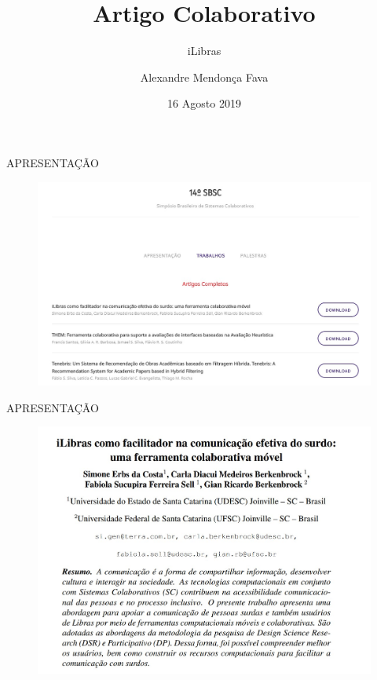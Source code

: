 \documentclass{Alexandre}
\title{Artigo Colaborativo}
\subtitle{iLibras}
\author{Alexandre Mendonça Fava\inst{1}}
\institute[UDESC]{
  \newline \newline \newline
  \inst{1}
  Mestrado Acadêmico em Computação Aplicada - PPGCA
}
\date{16 Agosto 2019}
\begin{document}
\begin{frame}
  \titlepage
\end{frame}


\begin{frame}{APRESENTAÇÃO}

    \begin{figure}
        \includegraphics[scale = 0.4]{Figuras/ArtigoSBSC14.jpg}
    \end{figure}

\end{frame}


\begin{frame}{APRESENTAÇÃO}

    \begin{figure}
        \includegraphics[scale = 0.3]{Figuras/iLibras.jpg}
    \end{figure}

\end{frame}
\end{document}
